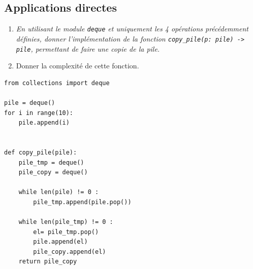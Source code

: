\subsection{Applications directes}

\begin{exemple}
\begin{enumerate}
\item \textit{En utilisant le module \texttt{deque} et uniquement les 4 opérations précédemment définies, donner l'implémentation de la fonction \texttt{copy\_pile(p: pile) -> pile}, permettant de faire une copie de la pile.}
\item {Donner la complexité de cette fonction.}
\end{enumerate}

\ifprof
\begin{lstlisting}
from collections import deque

pile = deque()
for i in range(10):
    pile.append(i)


def copy_pile(pile):
    pile_tmp = deque()
    pile_copy = deque()
    
    while len(pile) != 0 : 
        pile_tmp.append(pile.pop())
        
    while len(pile_tmp) != 0 : 
        el= pile_tmp.pop()
        pile.append(el)
        pile_copy.append(el)
    return pile_copy
\end{lstlisting}
\else
\vspace{5cm}
\fi

\end{exemple}





